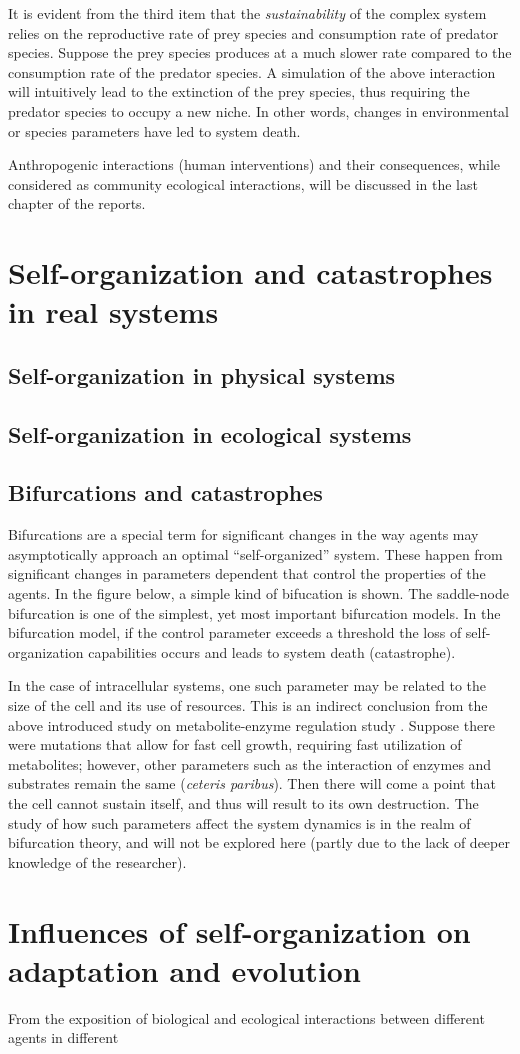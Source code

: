 It is evident from the third item that the \emph{sustainability} of the complex system relies on the reproductive rate of prey species and consumption rate of predator species.
Suppose the prey species produces at a much slower rate compared to the consumption rate of the predator species.
A simulation of the above interaction will intuitively lead to the extinction of the prey species, thus requiring the predator species to occupy a new niche.
In other words, changes in environmental or species parameters have led to system death.

Anthropogenic interactions (human interventions) and their consequences, while considered as community ecological interactions, will be discussed in the last chapter of the reports.

\section{Self-organization and catastrophes in real systems}

\subsection{Self-organization in physical systems}
\subsection{Self-organization in ecological systems}
\subsection{Bifurcations and catastrophes}

Bifurcations are a special term for significant changes in the way agents may asymptotically approach an optimal ``self-organized'' system.
These happen from significant changes in parameters dependent that control the properties of the agents.
In the figure below, a simple kind of bifucation is shown.
The saddle-node bifurcation is one of the simplest, yet most important bifurcation models.
In the bifurcation model, if the control parameter exceeds a threshold the loss of self-organization capabilities occurs and leads to system death (catastrophe).

In the case of intracellular systems, one such parameter may be related to the size of the cell and its use of resources.
This is an indirect conclusion from the above introduced study on metabolite-enzyme regulation study \cite{Chaves2019}.
Suppose there were mutations that allow for fast cell growth, requiring fast utilization of metabolites; however, other parameters such as the interaction of enzymes and substrates remain the same (\textit{ceteris paribus}).
Then there will come a point that the cell cannot sustain itself, and thus will result to its own destruction.
The study of how such parameters affect the system dynamics is in the realm of bifurcation theory, and will not be explored here (partly due to the lack of deeper knowledge of the researcher).

\section{Influences of self-organization on adaptation and evolution}
From the exposition of biological and ecological interactions between different agents in different
